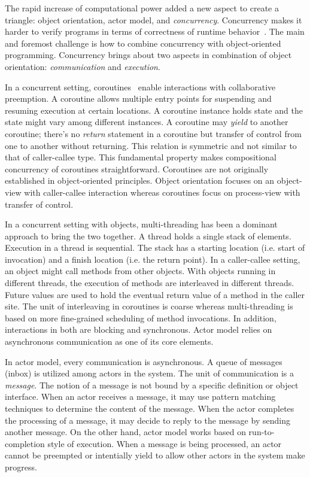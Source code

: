 The rapid increase of computational power added a new aspect to create a triangle: object orientation, actor model, and \emph{concurrency}.
Concurrency makes it harder to verify programs in terms of correctness of runtime behavior~\cite{Herlihy:1990:linear,johnsen:history,agha:predictive:safety}. 
The main and foremost challenge is how to combine concurrency with object-oriented programming.
Concurrency brings about two aspects in combination of object orientation: \emph{communication} and \emph{execution}.

In a concurrent setting, coroutines~\cite{conway1963design,taocp:knuth} enable interactions with collaborative preemption.
A coroutine allows multiple entry points for suspending and resuming execution at certain locations.
A coroutine instance holds state and the state might vary among different instances.
A coroutine may \emph{yield} to another coroutine;
there's no \emph{return} statement in a coroutine but transfer of control from one to another without returning.
This relation is symmetric and not similar to that of caller-callee type.
This fundamental property makes compositional concurrency of coroutines straightforward.
Coroutines are not originally established in object-oriented principles.
Object orientation focuses on an object-view with caller-callee interaction  whereas coroutines focus on process-view with transfer of control.

In a concurrent setting with objects, multi-threading has been a dominant approach to bring the two together.
A thread holds a single stack of elements.
Execution in a thread is sequential.
The stack has a starting location (i.e. start of invocation) and a finish location (i.e. the return point).
In a caller-callee setting, an object might call methods from other objects.
With objects running in different threads, the execution of methods are interleaved in different threads. 
Future values are used to hold the eventual return value of a method in the caller site.
The unit of interleaving in coroutines is coarse whereas multi-threading is based on more fine-grained scheduling of method invocations.
In addition, interactions in both are blocking and synchronous.
Actor model relies on asynchronous communication as one of its core elements.

In actor model, every communication is asynchronous. 
A queue of messages (inbox) is utilized among actors in the system.
The unit of communication is a \emph{message}.
The notion of a message is not bound by a specific definition or object interface.
When an actor receives a message, it may use pattern matching techniques to determine the content of the message.
When the actor completes the processing of a message, it may decide to reply to the message by sending another message.
On the other hand, actor model works based on run-to-completion style of execution.
When a message is being processed, an actor cannot be preempted or intentially yield to allow other actors in the system make progress.

